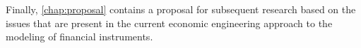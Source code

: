 Finally, \cref{chap:proposal} contains a proposal for subsequent research based on the issues that are present in the current economic engineering approach to the modeling of financial instruments.





